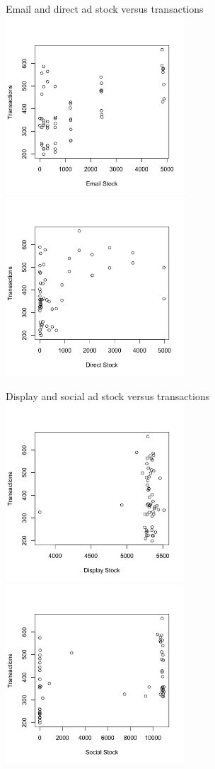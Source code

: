\documentclass[10pt, aspectratio=169]{beamer}
\begin{document}
\begin{frame}{Email and direct ad stock versus transactions}
\includegraphics[width=0.5\textwidth]{images/mixmodelemailstockvtrans.png}
\includegraphics[width=0.5\textwidth]{images/mixmodeldirectstockvtrans.png}
\end{frame}

\begin{frame}{Display and social ad stock versus transactions}
\includegraphics[width=0.5\textwidth]{images/mixmodeldisplaystockvtrans.png}
\includegraphics[width=0.5\textwidth]{images/mixmodelsocialstockvtrans.png}
\end{frame}
\end{document}

